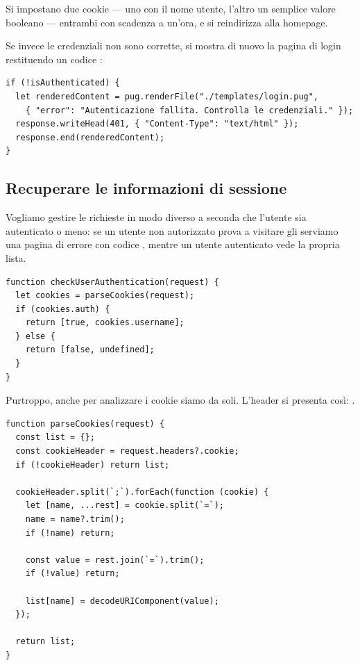 Si impostano due cookie --- uno con il nome utente, l'altro un semplice valore
booleano --- entrambi con scadenza a un'ora, e si reindirizza alla homepage.

Se invece le credenziali non sono corrette, si mostra di nuovo la pagina di
login restituendo un codice :

\begin{lstlisting}[style=js, name=login.js]
if (!isAuthenticated) {
  let renderedContent = pug.renderFile("./templates/login.pug",
    { "error": "Autenticazione fallita. Controlla le credenziali." });
  response.writeHead(401, { "Content-Type": "text/html" });
  response.end(renderedContent);
}
\end{lstlisting}

\subsection{Recuperare le informazioni di sessione}

Vogliamo gestire le richieste in modo diverso a seconda che l'utente sia
autenticato o meno: se un utente non autorizzato prova a visitare 
gli serviamo una pagina di errore con codice , mentre un utente
autenticato vede la propria lista.

\begin{lstlisting}[style=js, name=auth.js]
function checkUserAuthentication(request) {
  let cookies = parseCookies(request);
  if (cookies.auth) {
    return [true, cookies.username];
  } else {
    return [false, undefined];
  }
}
\end{lstlisting}

Purtroppo, anche per analizzare i cookie siamo da soli. L'header 
si presenta così: .

\begin{lstlisting}[style=js, name=cookies.js]
function parseCookies(request) {
  const list = {};
  const cookieHeader = request.headers?.cookie;
  if (!cookieHeader) return list;

  cookieHeader.split(`;`).forEach(function (cookie) {
    let [name, ...rest] = cookie.split(`=`);
    name = name?.trim();
    if (!name) return;

    const value = rest.join(`=`).trim();
    if (!value) return;

    list[name] = decodeURIComponent(value);
  });

  return list;
}
\end{lstlisting}

